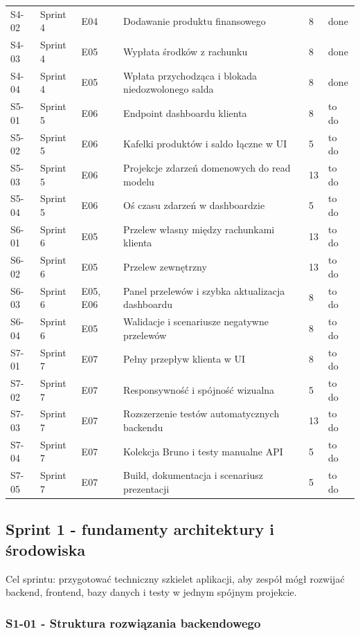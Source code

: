 \documentclass[12pt,a4paper]{article}
\begin{document}
\begin{longtable}{@{}L{0.08\textwidth}L{0.12\textwidth}L{0.10\textwidth}L{0.42\textwidth}C{0.06\textwidth}L{0.12\textwidth}@{}}
S4-02 & Sprint 4 & E04 & Dodawanie produktu finansowego & 8 & done \\
S4-03 & Sprint 4 & E05 & Wypłata środków z rachunku & 8 & done \\
S4-04 & Sprint 4 & E05 & Wpłata przychodząca i blokada niedozwolonego salda & 8 & done \\
S5-01 & Sprint 5 & E06 & Endpoint dashboardu klienta & 8 & to do \\
S5-02 & Sprint 5 & E06 & Kafelki produktów i saldo łączne w UI & 5 & to do \\
S5-03 & Sprint 5 & E06 & Projekcje zdarzeń domenowych do read modelu & 13 & to do \\
S5-04 & Sprint 5 & E06 & Oś czasu zdarzeń w dashboardzie & 5 & to do \\
S6-01 & Sprint 6 & E05 & Przelew własny między rachunkami klienta & 13 & to do \\
S6-02 & Sprint 6 & E05 & Przelew zewnętrzny & 13 & to do \\
S6-03 & Sprint 6 & E05, E06 & Panel przelewów i szybka aktualizacja dashboardu & 8 & to do \\
S6-04 & Sprint 6 & E05 & Walidacje i scenariusze negatywne przelewów & 8 & to do \\
S7-01 & Sprint 7 & E07 & Pełny przepływ klienta w UI & 8 & to do \\
S7-02 & Sprint 7 & E07 & Responsywność i spójność wizualna & 5 & to do \\
S7-03 & Sprint 7 & E07 & Rozszerzenie testów automatycznych backendu & 13 & to do \\
S7-04 & Sprint 7 & E07 & Kolekcja Bruno i testy manualne API & 5 & to do \\
S7-05 & Sprint 7 & E07 & Build, dokumentacja i scenariusz prezentacji & 5 & to do \\
\bottomrule
\end{longtable}
\endgroup

\subsection*{Sprint 1 - fundamenty architektury i środowiska}

Cel sprintu: przygotować techniczny szkielet aplikacji, aby zespół mógł rozwijać backend, frontend, bazy danych i testy w jednym spójnym projekcie.

\subsubsection*{S1-01 - Struktura rozwiązania backendowego}
\end{document}
